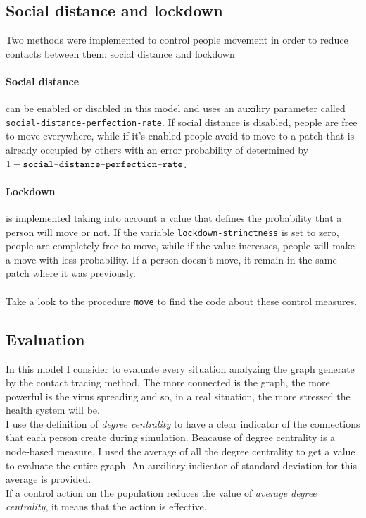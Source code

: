\documentclass[12pt]{llncs}
\begin{document}
\subsection{Social distance and lockdown}
Two methods were implemented to control people movement in order to reduce contacts between them: social distance and lockdown
\paragraph{Social distance} can be enabled or disabled in this model and uses an auxiliry parameter called \texttt{social-distance-perfection-rate}. If social distance is disabled, people are free to move everywhere, while if it's enabled people avoid to move to a patch that is already occupied by others with an error probability of determined by $1 - \textrm{\texttt{social-distance-perfection-rate}}$.
\paragraph{Lockdown} is implemented taking into account a value that defines the probability that a person will move or not. If the variable \texttt{lockdown-strinctness} is set to zero, people are completely free to move, while if the value increases, people will make a move with less probability. If a person doesn't move, it remain in the same patch where it was previously.\\ \\
Take a look to the procedure \texttt{move} to find the code about these control measures.


\subsection{Evaluation}
In this model I consider to evaluate every situation analyzing the graph generate by the contact tracing method. The more connected is the graph, the more powerful is the virus spreading and so, in a real situation, the more stressed the health system will be.\\
I use the definition of \textit{degree centrality} to have a clear indicator of the connections that each person create during simulation. Beacause of degree centrality is a node-based measure, I used the average of all the degree centrality to get a value to evaluate the entire graph. An auxiliary indicator of standard deviation for this average is provided. \\
If a control action on the population reduces the value of \textit{average degree centrality}, it means that the action is effective.
\end{document}
